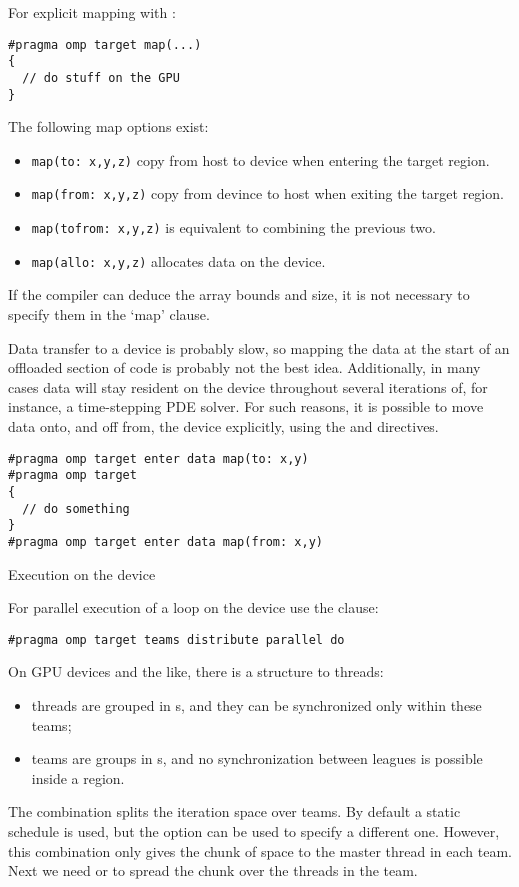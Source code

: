 For explicit mapping with :
\begin{lstlisting}
#pragma omp target map(...)
{
  // do stuff on the GPU
}
\end{lstlisting}
The following map options exist:
\begin{itemize}
\item \lstinline+map(to: x,y,z)+ copy from host to device
  when entering the target region.
\item \lstinline+map(from: x,y,z)+ copy from devince to host
  when exiting the target region.
\item \lstinline+map(tofrom: x,y,z)+ is equivalent to combining the previous two.
\item \lstinline+map(allo: x,y,z)+ allocates data on the device.
\end{itemize}

\begin{fortrannote}
  If the compiler can deduce the array bounds and size,
  it is not necessary to specify them in the `map' clause.
\end{fortrannote}

Data transfer to a device is probably slow,
so mapping the data at the start of an offloaded section of code
is probably not the best idea.
Additionally, in many cases data will stay resident on the device
throughout several iterations of, for instance, a time-stepping \ac{PDE} solver.
For such reasons, it is possible to move data onto, and off from,
the device explicitly,
using the  and
 directives.

\begin{lstlisting}
#pragma omp target enter data map(to: x,y)
#pragma omp target
{
  // do something
}
#pragma omp target enter data map(from: x,y)
\end{lstlisting}

 {Execution on the device}

For parallel execution of a loop on the device
use the  clause:
\begin{lstlisting}
#pragma omp target teams distribute parallel do
\end{lstlisting}

On GPU devices and the like, there is a structure to threads:
\begin{itemize}
\item threads are grouped in s,
  and they can be synchronized only within these teams;
\item teams are groups in s,
  and no synchronization between leagues is possible
  inside a  region.
\end{itemize}

The combination  splits the iteration space over teams.
By default a static schedule is used,
but the option  can be used to specify a different one.
However, this combination only gives the chunk of space to the master thread
in each team.
Next we need  or  to spread the chunk over the
threads in the team.
